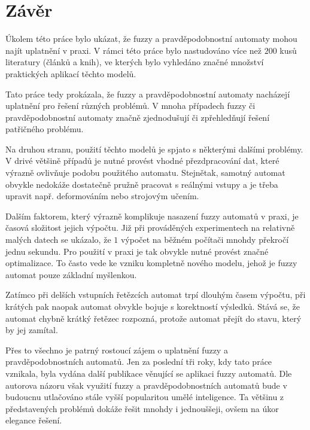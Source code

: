 \documentclass[a4paper,10pt]{article}
\begin{document}

\section{Závěr}
Úkolem této práce bylo ukázat, že fuzzy a pravděpodobnostní automaty mohou najít uplatnění v praxi. V rámci této práce bylo nastudováno více než $200$ kusů literatury (článků a knih), ve kterých bylo vyhledáno značné množství praktických aplikací těchto modelů.

Tato práce tedy prokázala, že fuzzy a pravděpodobnostní automaty nacházejí uplatnění pro řešení různých problémů. V mnoha případech fuzzy či pravděpodobnostní automaty značně zjednodušují či zpřehledňují řešení patřičného problému.

Na druhou stranu, použití těchto modelů je spjato s některými dalšími problémy. V drivé většině případů je nutné provést vhodné přezdpracování dat, které výrazně ovlivňuje podobu použitého automatu. Stejnětak, samotný automat obvykle nedokáže dostatečně pružně pracovat s reálnými vstupy a je třeba upravit např. deformováním nebo strojovým učením.

Dalším faktorem, který výrazně komplikuje nasazení fuzzy automatů v praxi, je časová složitost jejich výpočtu. Již při prováděných experimentech na relativně malých datech se ukázalo, že $1$ výpočet na běžném počítači mnohdy překročí jednu sekundu. Pro použití v praxi je tak obvykle nutné provést značné optimalizace. To často vede ke vzniku kompletně nového modelu, jehož je fuzzy automat pouze základní myšlenkou.

Zatímco při delších vstupních řetězcích automat trpí dlouhým časem výpočtu, při krátých pak naopak automat obvykle bojuje s korektností výsledků. Stává se, že automat chybně krátký řetězec rozpozná, protože automat  přejít do stavu, který by jej zamítal.

Přes to všechno je patrný rostoucí zájem o uplatnění fuzzy a pravděpodobnostních automatů. Jen za poslední tři roky, kdy tato práce vznikala, byla vydána další publikace věnující se aplikaci fuzzy automatů. Dle autorova názoru však využití fuzzy a pravděpodobnostních automatů bude v budoucnu utlačováno stále vyšší popularitou umělé inteligence. Ta většinu z představených problémů dokáže řešit mnohdy i jednouššeji, ovšem na úkor elegance řešení.
\end{document}
